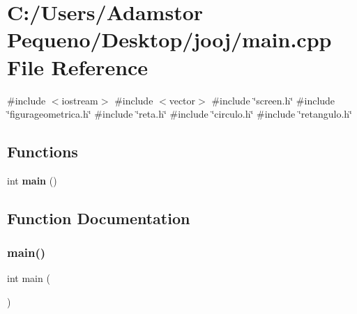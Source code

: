 \section{C\+:/\+Users/\+Adamstor Pequeno/\+Desktop/jooj/main.cpp File Reference}
\label{main_8cpp}
{\ttfamily \#include $<$iostream$>$}\newline
{\ttfamily \#include $<$vector$>$}\newline
{\ttfamily \#include \char`\"{}screen.\+h\char`\"{}}\newline
{\ttfamily \#include \char`\"{}figurageometrica.\+h\char`\"{}}\newline
{\ttfamily \#include \char`\"{}reta.\+h\char`\"{}}\newline
{\ttfamily \#include \char`\"{}circulo.\+h\char`\"{}}\newline
{\ttfamily \#include \char`\"{}retangulo.\+h\char`\"{}}\newline
\subsection*{Functions}
\begin{DoxyCompactItemize}
\item 
int \textbf{ main} ()
\end{DoxyCompactItemize}


\subsection{Function Documentation}
\mbox{\label{main_8cpp_ae66f6b31b5ad750f1fe042a706a4e3d4}} 
\subsubsection{main()}
{\footnotesize\ttfamily int main (\begin{DoxyParamCaption}{ }\end{DoxyParamCaption})}

